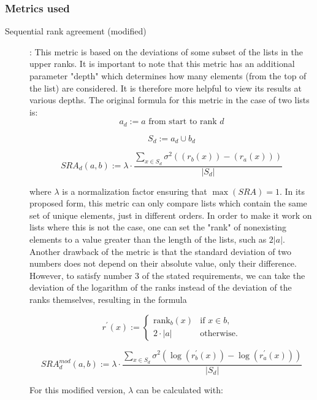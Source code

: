\subsubsection{Metrics used}

\begin{description}
	\item [Sequential rank agreement (modified)] \cite{ekstromSequentialRankAgreement2015}: This metric is based on the deviations of some subset of the lists in the upper ranks.
	      It is important to note that this metric has an additional parameter "depth" which determines how many elements (from the top of the list) are considered.
	      It is therefore more helpful to view its results at various depths.
	      The original formula for this metric in the case of two lists is:
	      \[
		      a_{d} := a \text{ from start to rank } d
	      \]

	      \[
		      S_{d} := a_{d} \cup b_{d}
	      \]

	      \[
		      SRA_{d}(a, b) := \lambda \cdot \frac{\sum_{x \in S_{d}} \sigma ^2 \left( \left( r_{b}(x) \right) - \left( r_{a}(x) \right) \right)}{|S_{d}|}
	      \]

	      where \(\lambda\) is a normalization factor ensuring that \(\max(SRA) = 1\).
	      In its proposed form, this metric can only compare lists which contain the same set of unique elements, just in different orders.
	      In order to make it work on lists where this is not the case, one can set the "rank" of nonexisting elements to a value greater than the length of the lists, such as \(2 |a|\).
	      Another drawback of the metric is that the standard deviation of two numbers does not depend on their absolute value, only their difference.
	      However, to satisfy number 3 of the stated requirements, we can take the deviation of the logarithm of the ranks instead of the deviation of the ranks themselves, resulting in the formula

	      \[
		      r^{\prime}(x) :=
		      \begin{cases}
			      \mathrm{rank}_{b}(x) & \text{if } x \in b, \\
			      2 \cdot |a|          & \text{otherwise.}
		      \end{cases}
	      \]

	      \[
		      SRA^{mod}_{d}(a, b) := \lambda \cdot \frac{\sum_{x \in S_{d}} \sigma ^2 \left( \log (r^{\prime}_{b}(x))-\log(r^{\prime}_{a}(x))\right)}{|S_{d}|}
	      \]

	      For this modified version, \(\lambda\) can be calculated with:


\end{description}
